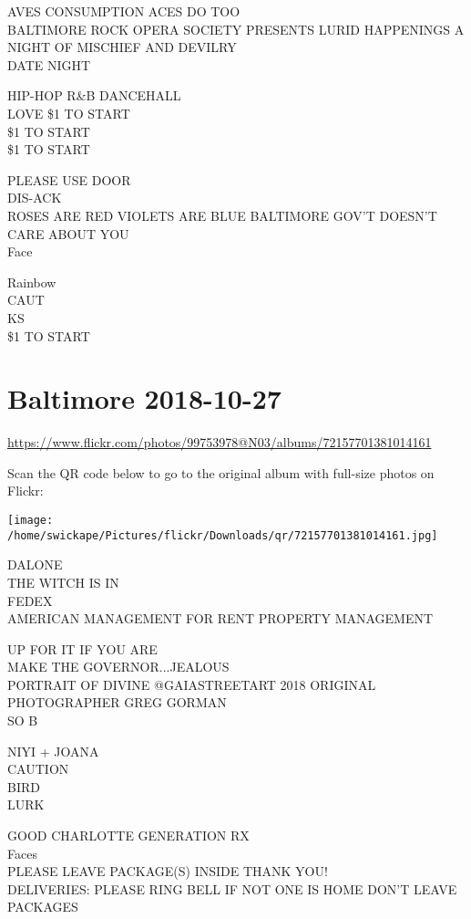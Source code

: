 \documentclass[10pt,letterpaper]{article}
\begin{document}
AVES CONSUMPTION ACES DO TOO\\
BALTIMORE ROCK OPERA SOCIETY PRESENTS LURID HAPPENINGS A NIGHT OF MISCHIEF AND DEVILRY\\
DATE NIGHT

HIP{-}HOP R\&B DANCEHALL\\
LOVE \$1 TO START\\
\$1 TO START\\
\$1 TO START

PLEASE USE DOOR\\
DIS{-}ACK\\
ROSES ARE RED VIOLETS ARE BLUE BALTIMORE GOV'T DOESN'T CARE ABOUT YOU\\
Face

Rainbow\\
CAUT\\
KS\\
\$1 TO START
\pagebreak

\section*{Baltimore 2018-10-27}

\url{https://www.flickr.com/photos/99753978@N03/albums/72157701381014161}

Scan the QR code below to go to the original album with full-size photos on Flickr:

\texttt{[image: /home/swickape/Pictures/flickr/Downloads/qr/72157701381014161.jpg]}
\pagebreak

DALONE\\
THE WITCH IS IN\\
FEDEX\\
AMERICAN MANAGEMENT FOR RENT PROPERTY MANAGEMENT

UP FOR IT IF YOU ARE\\
MAKE THE GOVERNOR...JEALOUS\\
PORTRAIT OF DIVINE @GAIASTREETART 2018 ORIGINAL PHOTOGRAPHER GREG GORMAN\\
SO B

NIYI + JOANA\\
CAUTION\\
BIRD\\
LURK

GOOD CHARLOTTE GENERATION RX\\
Faces\\
PLEASE LEAVE PACKAGE(S) INSIDE THANK YOU!\\
DELIVERIES: PLEASE RING BELL IF NOT ONE IS HOME DON'T LEAVE PACKAGES
\end{document}
